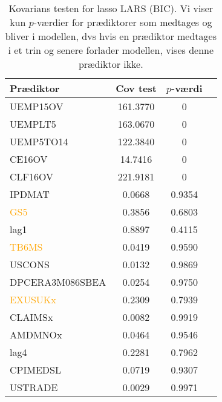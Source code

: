 \begin{table}[ht] 
\centering 
\begin{tabular}{lccc}
\toprule
Prædiktor & Cov test & \(p\)-værdi \\
\midrule
\textcolor{blue3}{UEMP15OV}    &       161.3770  &0\\
\textcolor{blue3}{UEMPLT5}   &      163.0670 & 0\\
\textcolor{blue3}{UEMP5TO14}    &    122.3840&  0\\
\textcolor{blue3}{CE16OV}         &   14.7416 & 0\\
\textcolor{blue3}{CLF16OV}        &   221.9181 & 0\\
\textcolor{chartreuse4}{IPDMAT}         &    0.0668&  0.9354\\
\textcolor{orange}{GS5}&   0.3856 & 0.6803\\
\textcolor{blue3}{lag1}       &      0.8897 & 0.4115\\
\textcolor{orange}{TB6MS}  &    0.0419 & 0.9590\\
\textcolor{blue3}{USCONS} &    0.0132&  0.9869\\
\textcolor{red3}{ DPCERA3M086SBEA}          &  0.0254 & 0.9750\\
\textcolor{orange}{ EXUSUKx} &     0.2309 & 0.7939\\
\textcolor{blue3}{CLAIMSx} &      0.0082 &  0.9919\\
\textcolor{red3}{ AMDMNOx}  &     0.0464 & 0.9546\\
\textcolor{blue3}{lag4 }     &    0.2281&  0.7962\\
\textcolor{cadetblue2}{CPIMEDSL}  &   0.0719&  0.9307\\
\textcolor{blue3}{USTRADE}   &     0.0029 &  0.9971\\ \bottomrule
\end{tabular}
\caption{Kovarians testen for lasso LARS (BIC).
Vi viser kun \(p\)-værdier for prædiktorer som medtages og bliver i modellen, dvs hvis en prædiktor medtages i et trin og senere forlader modellen, vises denne prædiktor ikke.} \label{tab:covTest_bic}
\end{table} 

